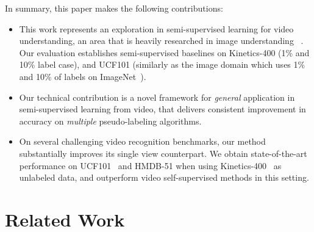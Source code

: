 \documentclass[10pt,twocolumn,letterpaper]{article}
\begin{document}
In summary, this paper makes the following contributions:
\begin{itemize}

	\item This work represents {an exploration in semi-supervised learning for video understanding,} 
	an area that is heavily researched in image understanding 
	~\cite{chen2020big, grandvalet2005semi, henaff2020data, fixmatch, uda}.
	{Our evaluation establishes semi-supervised baselines on Kinetics-400 (1\% and 10\% label case), and UCF101 (similarly as the image domain which uses 1\% and 10\% of labels on ImageNet~\cite{chen2020big, henaff2020data, fixmatch, uda}). 
	}
 
	
	\item Our technical contribution is a novel \ours framework for \textit{general} application in semi-supervised learning from video, that delivers consistent improvement in accuracy on \textit{multiple} pseudo-labeling algorithms. 
	
	\item On several challenging video recognition benchmarks, our method substantially improves {its single view} counterpart. We obtain state-of-the-art performance on UCF101~\cite{soomro2012ucf101} and HMDB-51 \cite{Kuehne11} when using Kinetics-400~\cite{kay2017kinetics} as unlabeled data, and outperform video self-supervised methods in this setting. 
	
\end{itemize}






\section{Related Work}\label{sec:related}
\end{document}
